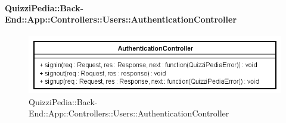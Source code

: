 \paragraph[QuizziPedia::Back-End::App::Controllers::Users\\::AuthenticationController]{QuizziPedia::Back-End::App::Controllers::Users::AuthenticationController}
\label{QuizziPedia::Back-End::App::Controllers::Users::AuthenticationController}
\begin{figure}[ht]
	\centering
	\includegraphics[scale=0.8]{UML/Classi/Back-End/QuizziPedia_Back-End_App_Controllers_Users_AuthenticationController.png}
	\caption{QuizziPedia::Back-End::App::Controllers::Users::AuthenticationController}
\end{figure}
\FloatBarrier

